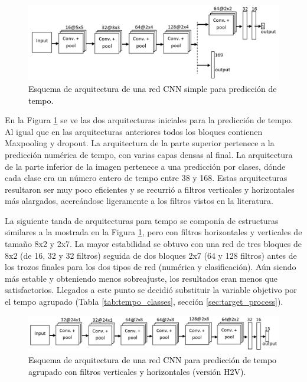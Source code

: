 \begin{figure}[htb]
  \centering
  \includegraphics[width=\textwidth]{Figures/simple_tempo_architecture.png}
  \caption{\textcolor{black}{Esquema de arquitectura de una red CNN simple para predicción de tempo}.}
  \label{Fig:simple_tempo_architecture}
\end{figure}

En la Figura \ref{Fig:simple_tempo_architecture} se ve las dos arquitecturas iniciales para la predicción de tempo. Al igual que en las arquitecturas anteriores todos los bloques contienen Maxpooling y dropout. La arquitectura de la parte superior pertenece a la predicción numérica de tempo, con varias capas densas al final. La arquitectura de la parte inferior de la imagen pertenece a una predicción por clases, dónde cada clase era un número entero de tempo entre 38 y 168. Estas arquitecturas resultaron ser muy poco eficientes y se recurrió a filtros verticales y horizontales más alargados, acercándose ligeramente a los filtros vistos en la literatura.

La siguiente tanda de arquitecturas para tempo se componía de estructuras similares a la mostrada en la Figura \ref{Fig:simple_tempo_architecture}, pero con filtros horizontales y verticales de tamaño 8x2 y 2x7. La mayor estabilidad se obtuvo con una red de tres bloques de 8x2 (de 16, 32 y 32 filtros) seguida de dos bloques 2x7 (64 y 128 filtros) antes de los trozos finales para los dos tipos de red (numérica y clasificación). Aún siendo más estable y obteniendo menos sobreajuste, los resultados eran menos que satisfactorios. Llegados a este punto se decidió substituir la variable objetivo por el tempo agrupado (Tabla \ref{tab:tempo_classes}, sección \ref{sec:target_process}).

\begin{figure}[htb]
  \centering
  \includegraphics[width=\textwidth]{Figures/tempo_2_architecture.png}
  \caption{\textcolor{black}{Esquema de arquitectura de una red CNN para predicción de tempo agrupado con filtros verticales y horizontales (versión H2V)}.}
  \label{Fig:tempo_2_architecture}
\end{figure}

